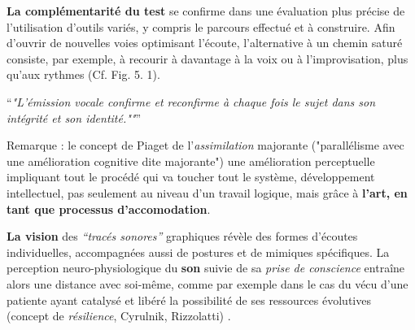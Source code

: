 
 \textbf{La complémentarité du test} se confirme dans une évaluation plus
 précise de l'utilisation d'outils variés, y compris  le parcours effectué et à
 construire.
 Afin d'ouvrir de nouvelles
 voies optimisant l'écoute, l'alternative à un chemin saturé
 consiste, par exemple, à recourir à davantage  à la voix ou à l'improvisation,
 plus qu'aux rythmes (Cf. Fig. 5. 1).

 \enquote{\emph{"L'émission vocale confirme et reconfirme à chaque
 fois le sujet dans son intégrité et son identité.""}}%
 \autocite{tomatis:loreille} %

 Remarque : le concept de Piaget de l'\textit{assimilation}
 majorante ("parallélisme avec une amélioration cognitive dite majorante")
une amélioration perceptuelle impliquant tout le procédé qui va toucher tout le
système, développement intellectuel, pas seulement au niveau d'un travail logique, mais grâce à \textbf{l'art, en tant que processus d'accomodation}.


\textbf{La vision}
des \textit{``tracés sonores''} graphiques révèle des formes
d'écoutes individuelles, accompagnées aussi de postures et de mimiques spécifiques.
La  perception
neuro-physiologique du \textbf{son} suivie de sa
\textit{prise de conscience }
entraîne alors une distance avec
soi-même, comme par exemple dans le cas
du vécu  d'une patiente ayant catalysé et libéré
la possibilité de ses ressources évolutives (concept de \textit{résilience}, Cyrulnik, Rizzolatti) \autocite[27--63]{van_eersel_cerveau}.


